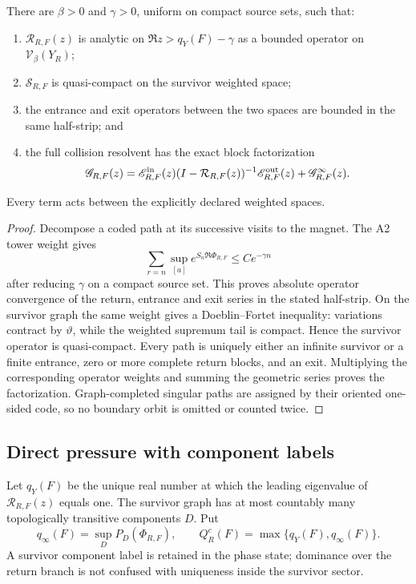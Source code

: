 \begin{lemma}
\label{lem:r5-a3-renewal}
There are \(\beta>0\) and \(\gamma>0\), uniform on compact source sets, such
that:
\begin{enumerate}[label=(\roman*)]
\item \(\mathcal R_{R,F}(z)\) is analytic on
      \(\Re z>q_Y(F)-\gamma\) as a bounded operator on
      \(\mathscr V_\beta(Y_R)\);
\item \(\mathcal S_{R,F}\) is quasi-compact on the survivor weighted space;
\item the entrance and exit operators between the two spaces are bounded in
      the same half-strip; and
\item the full collision resolvent has the exact block factorization
\[
 \mathscr G_{R,F}(z)=
 \mathscr E^{\rm in}_{R,F}(z)
 (I-\mathcal R_{R,F}(z))^{-1}
 \mathscr E^{\rm out}_{R,F}(z)
 +\mathscr G^{\infty}_{R,F}(z).
\]
\end{enumerate}
Every term acts between the explicitly declared weighted spaces.
\end{lemma}

\begin{proof}
Decompose a coded path at its successive visits to the magnet.  The A2 tower
weight gives
\[
 \sum_{r=n}\sup_{[a]}e^{S_n\Re\Phi_{R,F}}\le Ce^{-\gamma n}
\]
after reducing \(\gamma\) on a compact source set.  This proves absolute
operator convergence of the return, entrance and exit series in the stated
half-strip.  On the survivor graph the same weight gives a Doeblin--Fortet
inequality: variations contract by \(\vartheta\), while the weighted
supremum tail is compact.  Hence the survivor operator is quasi-compact.
Every path is uniquely either an infinite survivor or a finite entrance,
zero or more complete return blocks, and an exit.  Multiplying the
corresponding operator weights and summing the geometric series proves the
factorization.  Graph-completed singular paths are assigned by their oriented
one-sided code, so no boundary orbit is omitted or counted twice.
\end{proof}

\subsection{Direct pressure with component labels}

Let \(q_Y(F)\) be the unique real number at which the leading eigenvalue of
\(\mathcal R_{R,F}(z)\) equals one.  The survivor graph has at most countably
many topologically transitive components \(D\).  Put
\[
 q_\infty(F)=\sup_D P_D(\Phi_{R,F}),
 \qquad Q_R^c(F)=\max\{q_Y(F),q_\infty(F)\}.
\]
A survivor component label is retained in the phase state; dominance over the
return branch is not confused with uniqueness inside the survivor sector.

